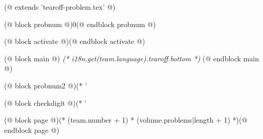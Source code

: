 (@ extends 'tearoff-problem.tex' @)

(@ block probnum @)0(@ endblock probnum @)

(@ block activate @)(@ endblock activate @)

(@ block main @)
    \centering
    \vspace*{(* competition.tearoff.bottomsep *)mm}
    \LARGE
    \textit{(* i18n.get(team.language).tearoff.bottom *)}
(@ endblock main @)

(@ block probnum2 @)(* '%

(@ block checkdigit @)(* '%

(@ block page @)(* (team.number + 1) * (volume.problems|length + 1) *)(@ endblock page @)

